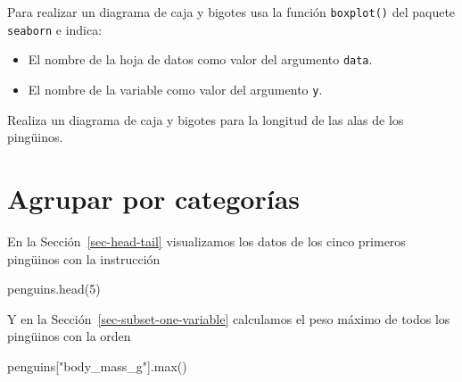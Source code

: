 \documentclass[
  a4paper,
  noprof,
  12pt,
  notoc,
  nosols,
  nobib]{mnye}
\newenvironment{Shaded}{\begin{snugshade}}{\end{snugshade}}
\newcommand{\BuiltInTok}[1]{\textcolor[rgb]{0.00,0.23,0.31}{#1}}
\newcommand{\DecValTok}[1]{\textcolor[rgb]{0.68,0.00,0.00}{#1}}
\newcommand{\NormalTok}[1]{\textcolor[rgb]{0.00,0.23,0.31}{#1}}
\newcommand{\StringTok}[1]{\textcolor[rgb]{0.13,0.47,0.30}{#1}}
\providecommand{\tightlist}{%
  \setlength{\itemsep}{0pt}\setlength{\parskip}{0pt}}\usepackage{longtable,booktabs,array}
\renewenvironment{exercise}[1][]{
            \if\relax\detokenize{#1}\relax
                \ex
            \else
                \ex[note={#1}]
            \fi
        }{\endex}
\theoremstyle{definition}
\newtheorem{exercise}{Ejercicio}[section]
\theoremstyle{remark}
\begin{document}
\begin{tcolorbox}[enhanced jigsaw, colframe=quarto-callout-note-color-frame, rightrule=.15mm, breakable, left=2mm, bottomrule=.15mm, arc=.35mm, leftrule=.75mm, opacityback=0, toprule=.15mm, colback=white]
\begin{minipage}[t]{5.5mm}
\textcolor{quarto-callout-note-color}{\faInfo}
\end{minipage}%
\begin{minipage}[t]{\textwidth - 5.5mm}

Para realizar un diagrama de caja y bigotes usa la función
\texttt{boxplot()} del paquete \texttt{seaborn} e indica:

\begin{itemize}
\tightlist
\item
  El nombre de la hoja de datos como valor del argumento \texttt{data}.
\item
  El nombre de la variable como valor del argumento \texttt{y}.
\end{itemize}

\end{minipage}%
\end{tcolorbox}

\begin{exercise}[]%
\protect\hypertarget{exr-1numerical-boxplot}{}\label{exr-1numerical-boxplot}%
Realiza un diagrama de caja y bigotes para la longitud de las alas de
los pingüinos.

\end{exercise}


\section{Agrupar por categorías}\label{sec-groupby}

En la Sección~\ref{sec-head-tail} visualizamos los datos de los cinco
primeros pingüinos con la instrucción

\begin{Shaded}
\begin{Highlighting}[]
\NormalTok{penguins.head(}\DecValTok{5}\NormalTok{)}
\end{Highlighting}
\end{Shaded}

Y en la Sección~\ref{sec-subset-one-variable} calculamos el peso máximo
de todos los pingüinos con la orden

\begin{Shaded}
\begin{Highlighting}[]
\NormalTok{penguins[}\StringTok{"body\_mass\_g"}\NormalTok{].}\BuiltInTok{max}\NormalTok{()}
\end{Highlighting}
\end{Shaded}
\end{document}
